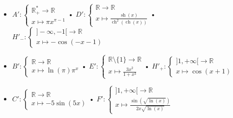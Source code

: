 \documentclass[10pt]{article}
\DeclareMathOperator{\ch}{ch}
\DeclareMathOperator{\sh}{sh}
\begin{document}
\begin{tcolorbox}[enhanced, width=7in, center, size=fbox, fontupper=\large, drop shadow southwest]
    \begin{itemize}
        \item $A':\begin{cases}\mathbb{R}^*_+\rightarrow\mathbb{R}\\x\mapsto\pi x^{\pi-1}\end{cases}$\hspace{1.8cm}• $D':\begin{cases}\mathbb{R}\rightarrow\mathbb{R}\\x\mapsto\frac{\sh(x)}{\ch^2(\ch(x))}\end{cases}$\hspace{1.6cm}• $H'_-:\begin{cases}]-\infty,-1[\rightarrow\mathbb{R}\\x\mapsto-\cos(-x-1)\end{cases}$
        \item $B':\begin{cases}\mathbb{R}\rightarrow\mathbb{R}\\x\mapsto\ln(\pi)\pi^x\end{cases}$\hspace{1.5cm}• $E':\begin{cases}\mathbb{R}\setminus\{1\}\rightarrow\mathbb{R}\\x\mapsto\frac{3x^2}{1+x^3}\end{cases}$\hspace{1.6cm}• $H'_+:\begin{cases}]1,+\infty[\rightarrow\mathbb{R}\\x\mapsto\cos(x+1)\end{cases}$
        \item $C':\begin{cases}\mathbb{R}\rightarrow\mathbb{R}\\x\mapsto-5\sin(5x)\end{cases}$\hspace{1.0cm}• $F':\begin{cases}]1,+\infty[\rightarrow\mathbb{R}\\x\mapsto\frac{\sin(\sqrt{\ln(x)})}{2x\sqrt{\ln(x)}}\end{cases}$
    \end{itemize}
\end{tcolorbox}

\end{document}
